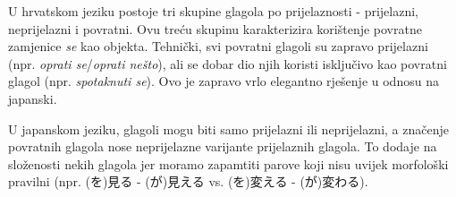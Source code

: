 	U hrvatskom jeziku postoje tri skupine glagola po prijelaznosti - prijelazni, neprijelazni i povratni. Ovu treću skupinu karakterizira korištenje povratne zamjenice \textit{se} kao objekta. Tehnički, svi povratni glagoli su zapravo prijelazni (npr. \textit{oprati se}/\textit{oprati nešto}), ali se dobar dio njih koristi isključivo kao povratni glagol (npr. \textit{spotaknuti se}). Ovo je zapravo vrlo elegantno rješenje u odnosu na japanski.
	
	U japanskom jeziku, glagoli mogu biti samo prijelazni ili neprijelazni, a značenje povratnih glagola nose neprijelazne varijante prijelaznih glagola. To dodaje na složenosti nekih glagola jer moramo zapamtiti parove koji nisu uvijek morfološki pravilni (npr. (を)見る - (が)見える vs. (を)変える - (が)変わる).

